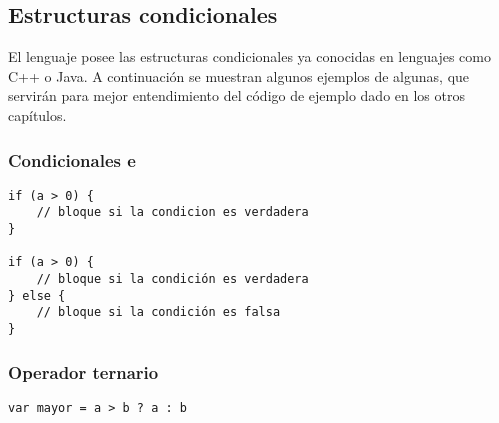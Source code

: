 \subsection{Estructuras condicionales}

El lenguaje posee las estructuras condicionales ya conocidas en lenguajes como C++ o Java. A continuación se muestran algunos ejemplos de algunas, que servirán para mejor entendimiento del código de ejemplo dado en los otros capítulos.

\subsubsection{Condicionales  e }

\begin{lstlisting}[title={Ejemplos de \code{if} e \code{if-else}}]
if (a > 0) {
	// bloque si la condicion es verdadera 
}

if (a > 0) {
	// bloque si la condición es verdadera
} else {
	// bloque si la condición es falsa
}
\end{lstlisting}

\subsubsection{Operador ternario }

\begin{lstlisting}[title={Operador ternario \code{?:}}]
var mayor = a > b ? a : b
\end{lstlisting}